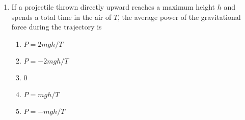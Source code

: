 \documentclass{../../../oss-legalpaper}
\begin{document}
\begin{multicols}{2}
\begin{enumerate}[leftmargin=18pt,resume]
%
%
%
    
  \item If a projectile thrown directly upward reaches a maximum height $h$ and
    spends a total time in the air of $T$, the average power of the
    gravitational force during the trajectory is
    \begin{enumerate}[noitemsep,topsep=0pt,leftmargin=18pt,label=(\Alph*)]
    \item $P=2mgh/T$
    \item $P=-2mgh/T$
    \item 0
    \item $P=mgh/T$
    \item $P=-mgh/T$
    \end{enumerate}


\end{enumerate}
\end{multicols}
\end{document}
